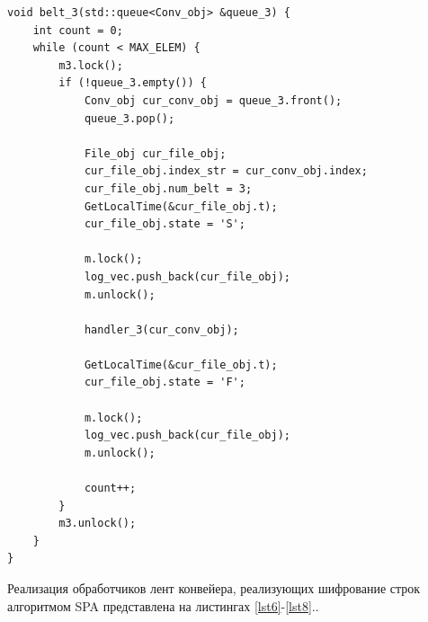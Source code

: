 \documentclass[a4paper,12pt]{article}
\begin{document}
\begin{lstlisting}[label=lst5,caption=Лента 3]
void belt_3(std::queue<Conv_obj> &queue_3) {
    int count = 0;
    while (count < MAX_ELEM) {
        m3.lock();
        if (!queue_3.empty()) {
            Conv_obj cur_conv_obj = queue_3.front();
            queue_3.pop();

            File_obj cur_file_obj;
            cur_file_obj.index_str = cur_conv_obj.index;
            cur_file_obj.num_belt = 3;
            GetLocalTime(&cur_file_obj.t);
            cur_file_obj.state = 'S';

            m.lock();
            log_vec.push_back(cur_file_obj);
            m.unlock();

            handler_3(cur_conv_obj);

            GetLocalTime(&cur_file_obj.t);
            cur_file_obj.state = 'F';

            m.lock();
            log_vec.push_back(cur_file_obj);
            m.unlock();

            count++;
        }
        m3.unlock();
    }
}
\end{lstlisting}

Реализация обработчиков лент конвейера, реализующих шифрование строк алгоритмом SPA представлена на листингах \ref{lst6}-\ref{lst8}..
\end{document}
